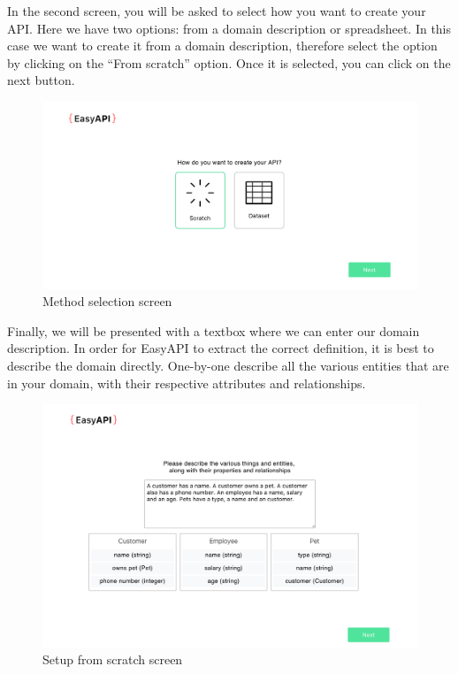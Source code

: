 In the second screen, you will be asked to select how you want to create your API. Here we have two options: from a domain description or spreadsheet. In this case we want to create it from a domain description, therefore select the option by clicking on the ``From scratch'' option. Once it is selected, you can click on the next button.

\begin{figure}
\label{methodscratch}
\centerline{\includegraphics[scale=0.4]{screenshots/methodscratch.png}}
\caption{Method selection screen}
\end{figure}


Finally, we will be presented with a textbox where we can enter our domain description. In order for EasyAPI to extract the correct definition, it is best to describe the domain directly. One-by-one describe all the various entities that are in your domain, with their respective attributes and relationships.



\begin{figure}
\label{naturalimg}
\centerline{\includegraphics[scale=0.4]{screenshots/natural.png}}
\caption{Setup from scratch screen}
\end{figure}




